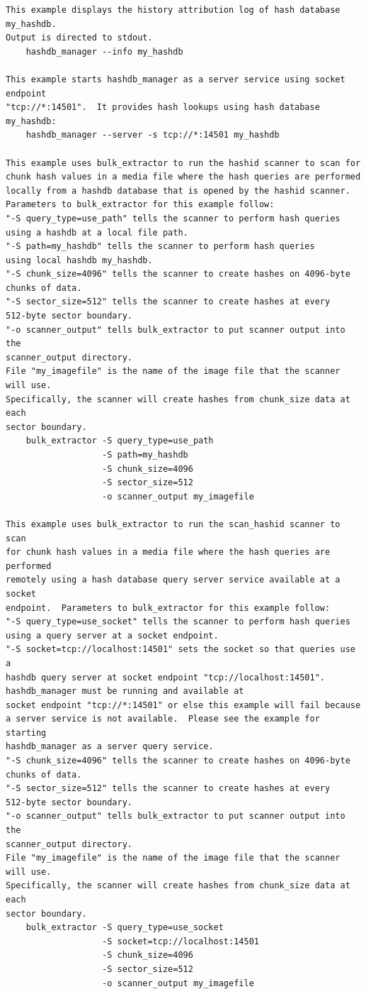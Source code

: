 \documentclass[11pt,twoside]{article}
\begin{document}
\begin{small}
\begin{verbatim}
This example displays the history attribution log of hash database my_hashdb.
Output is directed to stdout.
    hashdb_manager --info my_hashdb

This example starts hashdb_manager as a server service using socket endpoint
"tcp://*:14501".  It provides hash lookups using hash database my_hashdb:
    hashdb_manager --server -s tcp://*:14501 my_hashdb

This example uses bulk_extractor to run the hashid scanner to scan for
chunk hash values in a media file where the hash queries are performed
locally from a hashdb database that is opened by the hashid scanner.
Parameters to bulk_extractor for this example follow:
"-S query_type=use_path" tells the scanner to perform hash queries
using a hashdb at a local file path.
"-S path=my_hashdb" tells the scanner to perform hash queries
using local hashdb my_hashdb.
"-S chunk_size=4096" tells the scanner to create hashes on 4096-byte
chunks of data.
"-S sector_size=512" tells the scanner to create hashes at every
512-byte sector boundary.
"-o scanner_output" tells bulk_extractor to put scanner output into the
scanner_output directory.
File "my_imagefile" is the name of the image file that the scanner will use.
Specifically, the scanner will create hashes from chunk_size data at each
sector boundary.
    bulk_extractor -S query_type=use_path
                   -S path=my_hashdb
                   -S chunk_size=4096
                   -S sector_size=512
                   -o scanner_output my_imagefile

This example uses bulk_extractor to run the scan_hashid scanner to scan
for chunk hash values in a media file where the hash queries are performed
remotely using a hash database query server service available at a socket
endpoint.  Parameters to bulk_extractor for this example follow:
"-S query_type=use_socket" tells the scanner to perform hash queries
using a query server at a socket endpoint.
"-S socket=tcp://localhost:14501" sets the socket so that queries use a
hashdb query server at socket endpoint "tcp://localhost:14501".
hashdb_manager must be running and available at
socket endpoint "tcp://*:14501" or else this example will fail because
a server service is not available.  Please see the example for starting
hashdb_manager as a server query service.
"-S chunk_size=4096" tells the scanner to create hashes on 4096-byte
chunks of data.
"-S sector_size=512" tells the scanner to create hashes at every
512-byte sector boundary.
"-o scanner_output" tells bulk_extractor to put scanner output into the
scanner_output directory.
File "my_imagefile" is the name of the image file that the scanner will use.
Specifically, the scanner will create hashes from chunk_size data at each
sector boundary.
    bulk_extractor -S query_type=use_socket
                   -S socket=tcp://localhost:14501
                   -S chunk_size=4096
                   -S sector_size=512
                   -o scanner_output my_imagefile


\end{verbatim}
\end{small}
\end{document}
